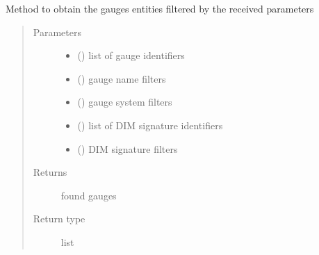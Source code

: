 \begin{fulllineitems}
\begin{fulllineitems}
\label{\detokenize{eboa.engine:eboa.engine.query.Query.get_gauges}}
Method to obtain the gauges entities filtered by the received parameters
\begin{quote}\begin{description}
\item[{Parameters}] \leavevmode\begin{itemize}
\item {} 
 () \textendash{} list of gauge identifiers

\item {} 
 () \textendash{} gauge name filters

\item {} 
 () \textendash{} gauge system filters

\item {} 
 () \textendash{} list of DIM signature identifiers

\item {} 
 () \textendash{} DIM signature filters

\end{itemize}

\item[{Returns}] \leavevmode
found gauges

\item[{Return type}] \leavevmode
list

\end{description}\end{quote}

\end{fulllineitems}



\end{fulllineitems}
